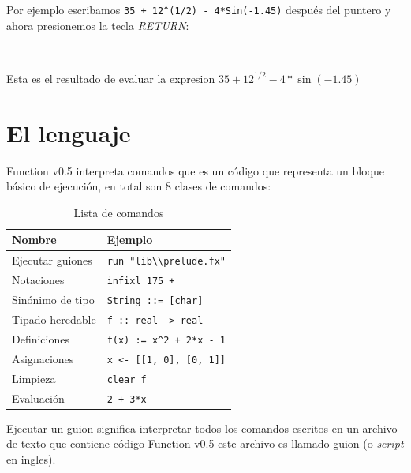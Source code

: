       Por ejemplo escribamos \texttt{35 + 12\^{}(1/2) - 4*Sin(-1.45)} después del puntero y ahora presionemos la tecla {\it RETURN}:
      
      \begin{fxcode}
         \\
          
      \end{fxcode}
      
      Esta es el resultado de evaluar la expresion $35 + 12^{1/2} - 4*\sin(-1.45)$
   
   \section{El lenguaje}
      Function v0.5 interpreta comandos que es un código que representa un bloque básico de ejecución, en total son 8 clases de comandos:
      
      \begin{longtable}[c]{ll}
         \caption{Lista de comandos}\label{tb:cmds} \\ \hline
         {\bf Nombre}      & {\bf Ejemplo} \\ \hline
         Ejecutar guiones  & \texttt{run "lib\textbackslash\textbackslash prelude.fx"} \\
         Notaciones        & \texttt{infixl 175 +} \\
         Sinónimo de tipo  & \texttt{String ::= [char]} \\
         Tipado heredable  & \texttt{f :: real -> real} \\
         Definiciones      & \texttt{f(x) := x\^{}2 + 2*x - 1} \\
         Asignaciones      & \texttt{x <- [[1, 0], [0, 1]]} \\
         Limpieza          & \texttt{clear f} \\
         Evaluación        & \texttt{2 + 3*x} \\
      \end{longtable}
      
      Ejecutar un guion significa interpretar todos los comandos escritos en un archivo de texto que contiene código Function v0.5 este archivo es llamado guion (o {\it script} en ingles).
      
      \begin{fxcode}
      \end{fxcode}
      
